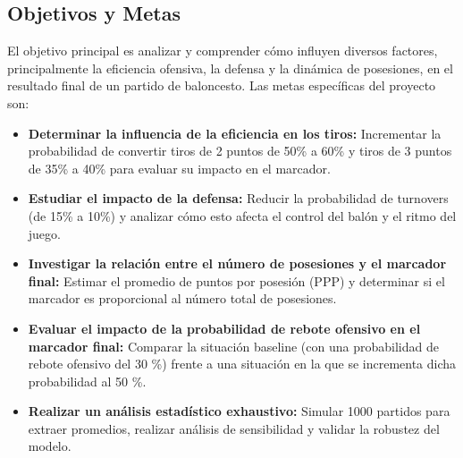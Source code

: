 \documentclass[12pt]{article}
\begin{document}
\subsection{Objetivos y Metas}
El objetivo principal es analizar y comprender cómo influyen diversos factores, principalmente la eficiencia ofensiva, la defensa y la dinámica de posesiones, en el resultado final de un partido de baloncesto. Las metas específicas del proyecto son:
\begin{itemize}
    \item \textbf{Determinar la influencia de la eficiencia en los tiros:} Incrementar la probabilidad de convertir tiros de 2 puntos de 50\% a 60\% y tiros de 3 puntos de 35\% a 40\% para evaluar su impacto en el marcador.
    \item \textbf{Estudiar el impacto de la defensa:} Reducir la probabilidad de turnovers (de 15\% a 10\%) y analizar cómo esto afecta el control del balón y el ritmo del juego.
    \item \textbf{Investigar la relación entre el número de posesiones y el marcador final:} Estimar el promedio de puntos por posesión (PPP) y determinar si el marcador es proporcional al número total de posesiones.
    \item  \textbf{Evaluar el impacto de la probabilidad de rebote ofensivo en el marcador final: } Comparar la situación baseline (con una probabilidad de rebote ofensivo del 30 \%) frente a una situación en la que se incrementa dicha probabilidad al 50 \%. 
    \item \textbf{Realizar un análisis estadístico exhaustivo:} Simular 1000 partidos para extraer promedios, realizar análisis de sensibilidad y validar la robustez del modelo.
\end{itemize}
\end{document}
